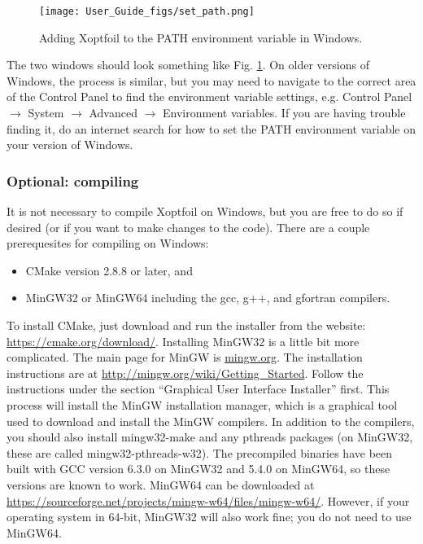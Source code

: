 \documentclass[11pt]{article}
\begin{document}
\begin{figure}
\centering
  \texttt{[image: User\_Guide\_figs/set\_path.png]}
\caption{Adding Xoptfoil to the PATH environment variable in Windows.}
\label{fig:set_path}
\end{figure}

The two windows should look something like Fig. \ref{fig:set_path}.
On older versions of Windows, the process is similar, but you may need to navigate to the
correct area of the Control Panel to find the environment variable settings, e.g. Control
Panel $\rightarrow$ System $\rightarrow$ Advanced $\rightarrow$ Environment variables. If
you are having trouble finding it, do an internet search for how to set the PATH
environment variable on your version of Windows.

\subsubsection{Optional: compiling}

It is not necessary to compile Xoptfoil on Windows, but you are free to do so if desired
(or if you want to make changes to the code). There are a couple prerequesites for
compiling on Windows:

\begin{itemize}
  \item{CMake version 2.8.8 or later, and}
  \item{MinGW32 or MinGW64 including the gcc, g++, and gfortran compilers.}
\end{itemize}

To install CMake, just download and run the installer from the website:
\url{https://cmake.org/download/}. Installing MinGW32 is a little bit more complicated.
The main page for
MinGW is \url{mingw.org}. The installation instructions are at
\url{http://mingw.org/wiki/Getting_Started}. Follow the instructions under the section
``Graphical User Interface Installer'' first. This process will install the MinGW
installation manager, which is a graphical tool used to download and install the MinGW
compilers. In addition to the compilers, you should also install mingw32-make and any
pthreads packages (on MinGW32, these are called mingw32-pthreads-w32). The precompiled
binaries have been built with GCC version 6.3.0 on MinGW32 and 5.4.0 on MinGW64, so these
versions are known to work. MinGW64 can be downloaded at
\url{https://sourceforge.net/projects/mingw-w64/files/mingw-w64/}. However, if your
operating system in 64-bit, MinGW32 will also work fine; you do not need to use MinGW64.
\end{document}
